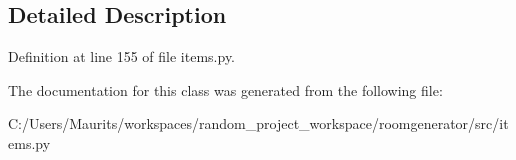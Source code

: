 \subsection{Detailed Description}


Definition at line 155 of file items.\+py.



The documentation for this class was generated from the following file\+:\begin{DoxyCompactItemize}
\item 
C\+:/\+Users/\+Maurits/workspaces/random\+\_\+project\+\_\+workspace/roomgenerator/src/items.\+py\end{DoxyCompactItemize}
